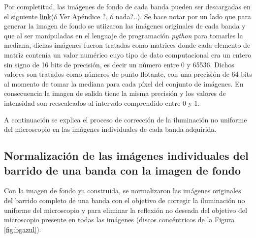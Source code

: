 Por completitud, las imágenes de fondo de cada banda pueden ser descargadas en el siguiente \href{https://google.com/open?id=1LfXvzmIMxf18PmQXzHdFhJl9xa6Ot2BS}{link}(ó Ver Apéndice ?, ó nada?..). Se hace notar por un lado que para generar la imagen de fondo se utiizaron las imágenes originales de cada banda y que al ser manipuladas en el lenguaje de programación \textit{python} para tomarles la mediana, dichas imágenes fueron tratadas como matrices donde cada elemento de matriz contenía un valor numérico cuyo tipo de dato computacional era un entero sin signo de 16 bits de precisión, es decir un número entre 0 y 65536. Dichos valores son tratados como números de punto flotante, con una precisión de 64 bits al momento de tomar la mediana para cada píxel del conjunto de imágenes. En consecuencia la imagen de salida tiene la misma precisión y los valores de intensidad son reescaleados al intervalo comprendido entre 0 y 1.

A continuación se explica el proceso de corrección de la iluminación no uniforme del microscopio en las imágenes individuales de cada banda adquirida.	
	
\singlespacing
\subsection{Normalización de las imágenes individuales del barrido de una banda con la imagen de fondo \href{https://github.com/jrr1984/defects_analysis/blob/master/MAIN/bg_normalization.py}{\faGithub}}

\hspace{0.5cm} Con la imagen de fondo ya construida, se normalizaron las imágenes originales del barrido completo de una banda\cite{Nordenfelt} con el objetivo de corregir la iluminación no uniforme del microscopio y para eliminar la reflexión no deseada del objetivo del microscopio presente en todas las imágenes (discos concéntricos de la Figura \ref{fig:bgazul}). 


